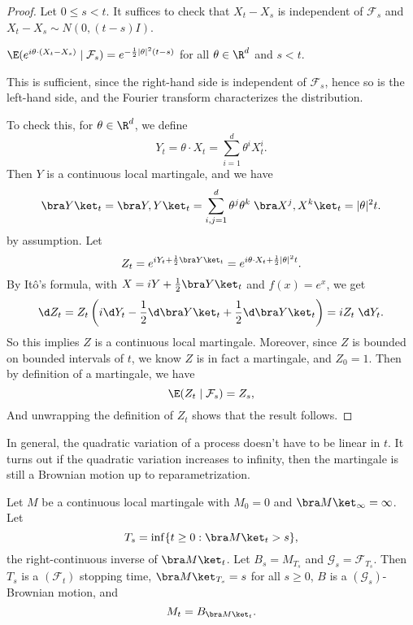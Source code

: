 \documentclass[a4paper]{article}
\begin{document}
\begin{proof}
  Let $0 \leq s < t$. It suffices to check that $X_t - X_s$ is independent of $\mathcal{F}_s$ and $X_t - X_s \sim N(0, (t - s) I)$.
  \begin{claim}
    $\E(e^{i\theta \cdot (X_t - X_s)} \mid \mathcal{F}_s) = e^{-\frac{1}{2} |\theta|^2 (t - s)}$ for all $\theta \in \R^d$ and $s < t$.
  \end{claim}
  This is sufficient, since the right-hand side is independent of $\mathcal{F}_s$, hence so is the left-hand side, and the Fourier transform characterizes the distribution.

  To check this, for $\theta \in \R^d$, we define
  \[
    Y_t = \theta \cdot X_t = \sum_{i = 1}^d \theta^i X_t^i.
  \]
  Then $Y$ is a continuous local martingale, and we have
  \[
    \bra Y\ket_t = \bra Y, Y\ket_t = \sum_{i, j = 1}^d \theta^j \theta^k\; \bra X^j, X^k\ket_t = |\theta|^2 t.
  \]
  by assumption. Let
  \[
    Z_t = e^{iY_t + \frac{1}{2} \bra Y\ket_t} = e^{i \theta \cdot X_t + \frac{1}{2} |\theta|^2 t}.
  \]
  By It\^o's formula, with $X = i Y + \frac{1}{2} \bra Y\ket_t$ and $f(x) = e^x$, we get
  \[
    \d Z_t = Z_t \left(i \d Y_t - \frac{1}{2} \d \bra Y\ket_t + \frac{1}{2} \d \bra Y\ket_t\right) = i Z_t \;\d Y_t.
  \]
  So this implies $Z$ is a continuous local martingale. Moreover, since $Z$ is bounded on bounded intervals of $t$, we know $Z$ is in fact a martingale, and $Z_0 = 1$. Then by definition of a martingale, we have
  \[
    \E (Z_t \mid \mathcal{F}_s) = Z_s,
  \]
  And unwrapping the definition of $Z_t$ shows that the result follows.
\end{proof}

In general, the quadratic variation of a process doesn't have to be linear in $t$. It turns out if the quadratic variation increases to infinity, then the martingale is still a Brownian motion up to reparametrization.
\begin{thm}
  Let $M$ be a continuous local martingale with $M_0 = 0$ and $\bra M\ket_\infty = \infty$. Let
  \[
    T_s = \inf \{t \geq 0: \bra M\ket_t > s\},
  \]
  the right-continuous inverse of $\bra M\ket_t$. Let $B_s = M_{T_s}$ and $\mathcal{G}_s = \mathcal{F}_{T_s}$. Then $T_s$ is a $(\mathcal{F}_t)$ stopping time, $\bra M\ket_{T_s} = s$ for all $s \geq 0$, $B$ is a $(\mathcal{G}_s)$-Brownian motion, and
  \[
    M_t = B_{\bra M\ket_t}.
  \]
\end{thm}
\end{document}
